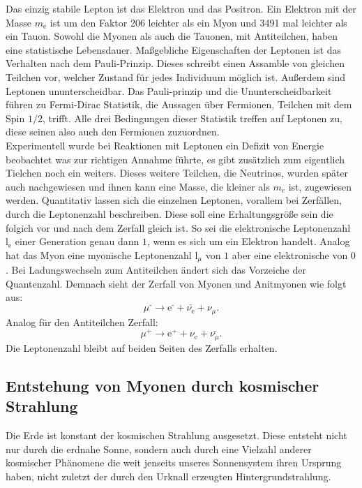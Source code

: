 Das einzig stabile Lepton ist das Elektron und das Positron. Ein Elektron mit der Masse $m_\text{e}$ ist um den Faktor 206 leichter als ein Myon und 3491 mal leichter als ein Tauon. 
Sowohl die Myonen als auch die Tauonen, mit Antiteilchen, haben eine statistische Lebensdauer. Maßgebliche Eigenschaften der
Leptonen ist das Verhalten nach dem Pauli-Prinzip. Dieses schreibt einen Assamble von gleichen Teilchen vor, welcher Zustand für jedes Individuum möglich ist. Außerdem sind Leptonen 
ununterscheidbar.  Das Pauli-prinzip und die Ununterscheidbarkeit führen zu Fermi-Dirac Statistik, die Aussagen über Fermionen, Teilchen mit dem Spin $1/2$, trifft. Alle drei Bedingungen dieser Statistik
treffen auf Leptonen zu, diese seinen also auch den Fermionen zuzuordnen.  
\\
\newline
Experimentell wurde bei Reaktionen mit Leptonen ein Defizit von Energie beobachtet was zur richtigen Annahme führte, es gibt zusätzlich zum eigentlich Tielchen noch ein weiters. 
Dieses weitere Teilchen, die Neutrinos, wurden später auch nachgewiesen und ihnen kann eine Masse, die kleiner als $m_e$ ist, zugewiesen werden.
Quantitativ lassen sich die einzelnen Leptonen, vorallem bei Zerfällen, durch die Leptonenzahl beschreiben. Diese soll eine Erhaltungsgröße sein
die folgich vor und nach dem Zerfall gleich ist. So sei die elektronische Leptonenzahl $\text{l}_\text{e}$ einer Generation genau dann $1$, wenn es sich um ein Elektron handelt. 
Analog hat das Myon eine myonische Leptonenzahl $\text{l}_\mu$ von $1$ aber eine elektronische von $0$. Bei Ladungswechseln zum Antiteilchen ändert sich das Vorzeiche der Quantenzahl.
Demnach sieht der Zerfall von Myonen und Anitmyonen wie folgt aus:
\begin{equation*}
    \mu^\text{-} \rightarrow \text{e}^\text{-} + \bar{\nu_\text{e}} + \nu_\mu.
\end{equation*}
Analog für den Antiteilchen Zerfall:
\begin{equation*}
    \mu^\text{+} \rightarrow \text{e}^\text{+} + \nu_\text{e} + \bar{\nu_\mu}.
\end{equation*}
Die Leptonenzahl bleibt auf beiden Seiten des Zerfalls erhalten. 

\subsection{Entstehung von Myonen durch kosmischer Strahlung}
Die Erde ist konstant der kosmischen Strahlung ausgesetzt. Diese entsteht nicht nur durch die erdnahe Sonne, sondern auch durch eine Vielzahl anderer kosmischer Phänomene die weit jenseits unseres Sonnensystem ihren Ursprung haben, nicht zuletzt der
durch den Urknall erzeugten Hintergrundstrahlung. 